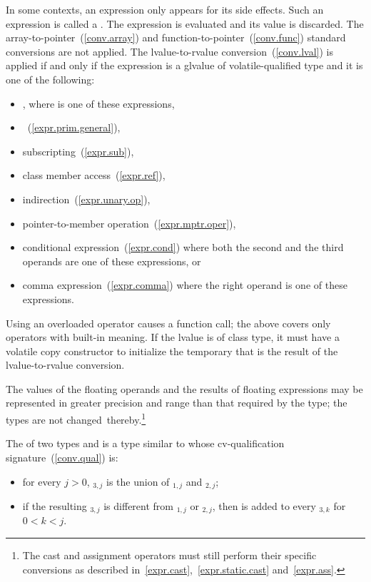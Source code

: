 \pnum
In some contexts, an expression only appears for its side effects. Such an
expression is called a . The expression is
evaluated and its value is discarded. The array-to-pointer~(\ref{conv.array})
and function-to-pointer~(\ref{conv.func}) standard conversions are not
applied. The lvalue-to-rvalue conversion~(\ref{conv.lval}) is applied
if and only if
the expression is a glvalue of volatile-qualified type and it is one of the
following:

\begin{itemize}
\item \tcode{(}  \tcode{)}, where
   is one of these expressions,
\item {}~(\ref{expr.prim.general}),
\item subscripting~(\ref{expr.sub}),
\item class member access~(\ref{expr.ref}),
\item indirection~(\ref{expr.unary.op}),
\item pointer-to-member operation~(\ref{expr.mptr.oper}),
\item conditional expression~(\ref{expr.cond}) where both the second and the
      third operands are one of these expressions, or
\item comma expression~(\ref{expr.comma}) where the right operand is one of
      these expressions.
\end{itemize}

\enternote Using an overloaded operator causes a function call; the
above covers only operators with built-in meaning. If the lvalue is of
class type, it must have a volatile copy constructor to initialize the
temporary that is the result of the lvalue-to-rvalue
conversion. \exitnote

\pnum
The values of the floating operands and the results of floating
expressions may be represented in greater precision and range than that
required by the type; the types are not changed\
thereby.\footnote{The cast and assignment operators must still perform their specific
conversions as described in~\ref{expr.cast},~\ref{expr.static.cast}
and~\ref{expr.ass}.}

\pnum
The  of two types  and 
is a type \tcode{T3}
similar to  whose cv-qualification signature~(\ref{conv.qual}) is:
\begin{itemize}
\item
for every $j > 0$, \cv$_{3,j}$ is the union of
\cv$_{1,j}$ and \cv$_{2,j}$;

\item
if the resulting \cv$_{3,j}$ is different from
\cv$_{1,j}$ or \cv$_{2,j}$, then
 is added to every \cv$_{3,k}$ for $0 < k < j$.
\end{itemize}

